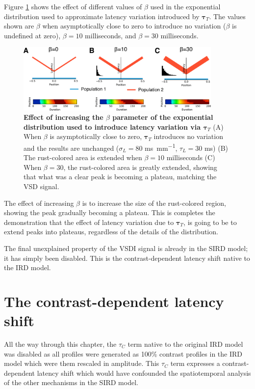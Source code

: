 \documentclass[phd,ianc,twoside]{infthesis}
\begin{document}
Figure \ref{fig:sird_calibration_tauT} shows the effect of different
values of $\beta$ used in the exponential distribution used to
approximate latency variation introduced by $\pmb{\tau}_T$. The values
shown are $\beta$ when asymptotically close to zero to introduce no
variation ($\beta$ is undefined at zero), $\beta=10$ milliseconds, and
$\beta=30$ milliseconds.


\begin{figure}
  \center
  \includegraphics[width=0.9\textwidth]{./figures/sird_calibration_tauT.pdf}
\caption{{\bf Effect of increasing the $\beta$ parameter of the
    exponential distribution used to introduce latency variation via
    $\pmb{\tau}_T$ } (A) When $\beta$ is asymptotically close to zero,
  $\pmb{\tau}_T$ introduces no variation and the results are unchanged
  ($\sigma_L=80$ \si{ms.mm^{-1}}, $\tau_L=30$ ms) (B) The rust-colored
  area is extended when $\beta=10$ milliseconds (C) When $\beta=30$, the
  rust-colored area is greatly extended, showing that what was a clear
  peak is becoming a plateau, matching the VSD signal.}
\label{fig:sird_calibration_tauT}
\end{figure}

The effect of increasing $\beta$ is to increase the size of the
rust-colored region, showing the peak gradually becoming a plateau. This
is completes the demonstration that the effect of latency variation due
to $\pmb{\tau}_T$, is going to be to extend peaks into plateaus,
regardless of the details of the distribution.

The final unexplained property of the VSDI signal is already in the SIRD
model; it has simply been disabled. This is the contrast-dependent
latency shift native to the IRD model.

\section{The contrast-dependent latency shift}

All the way through this chapter, the $\tau_C$ term native to the
original IRD model was disabled as all profiles were generated as 100\%
contrast profiles in the IRD model which were them rescaled in
amplitude. This $\tau_C$ term expresses a contrast-dependent latency
shift which would have confounded the spatiotemporal analysis of the
other mechanisms in the SIRD model.
\end{document}
